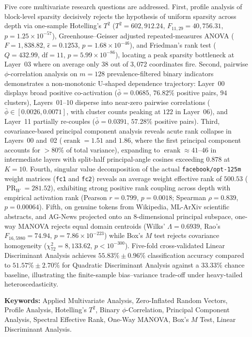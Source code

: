 \documentclass[12pt, a4paper, oneside]{report}
\theoremstyle{definition}
\newcommand{\erank}{\operatorname{erank}}
\newcommand{\PR}{\operatorname{PR}}
\begin{document}
Five core multivariate research questions are addressed. First, profile analysis of block-level sparsity decisively rejects the hypothesis of uniform sparsity across depth via one-sample Hotelling's $T^2$ ($T^2 = 602{,}912.24$, $F_{11, 29} = 40{,}756.31$, $p = 1.25 \times 10^{-57}$), Greenhouse--Geisser adjusted repeated-measures ANOVA ($F = 1{,}838.82$, $\hat{\epsilon} = 0.1253$, $p = 1.68 \times 10^{-46}$), and Friedman's rank test ($Q = 432.99$, $\mathrm{df} = 11$, $p = 5.99 \times 10^{-86}$), locating a peak sparsity bottleneck at Layer~03 where on average only $38$ out of $3{,}072$ coordinates fire. Second, pairwise $\phi$-correlation analysis on $m = 128$ prevalence-filtered binary indicators demonstrates a non-monotonic U-shaped dependence trajectory: Layer~00 displays broad positive co-activation ($\bar{\phi} = 0.0685$, $76.82\%$ positive pairs, $94$ clusters), Layers~01--10 disperse into near-zero pairwise correlations ($\bar{\phi} \in [0.0026, 0.0071]$, with cluster counts peaking at $122$ in Layer~06), and Layer~11 partially re-couples ($\bar{\phi} = 0.0391$, $57.28\%$ positive pairs). Third, covariance-based principal component analysis reveals acute rank collapse in Layers~00 and~02 ($\erank = 1.51$ and $1.86$, where the first principal component accounts for $>80\%$ of total variance), expanding to $\erank \approx 41\text{--}46$ in intermediate layers with split-half principal-angle cosines exceeding $0.878$ at $K = 10$. Fourth, singular value decomposition of the actual \texttt{facebook/opt-125m} weight matrices (\texttt{fc1} and \texttt{fc2}) reveals an average weight effective rank of $500.53$ ($\PR_W = 281.52$), exhibiting strong positive rank coupling across depth with empirical activation rank (Pearson $r = 0.799$, $p = 0.0018$; Spearman $\rho = 0.839$, $p = 0.00064$). Fifth, on genuine tokens from Wikipedia, ML-ArXiv scientific abstracts, and AG-News projected onto an $8$-dimensional principal subspace, one-way MANOVA rejects equal domain centroids (Wilks' $\Lambda = 0.6939$, Rao's $F_{16, 5980} = 74.94$, $p = 7.86 \times 10^{-223}$) while Box's $M$ test rejects covariance homogeneity ($\chi^2_{72} = 8{,}133.62$, $p < 10^{-300}$). Five-fold cross-validated Linear Discriminant Analysis achieves $55.83\% \pm 0.96\%$ classification accuracy compared to $51.57\% \pm 2.70\%$ for Quadratic Discriminant Analysis against a $33.33\%$ chance baseline, illustrating the finite-sample bias--variance trade-off under heavy-tailed heteroscedasticity.

\vspace{0.5cm}
\noindent\textbf{Keywords:} Applied Multivariate Analysis, Zero-Inflated Random Vectors, Profile Analysis, Hotelling's $T^2$, Binary $\phi$-Correlation, Principal Component Analysis, Spectral Effective Rank, One-Way MANOVA, Box's $M$ Test, Linear Discriminant Analysis.
\end{document}
